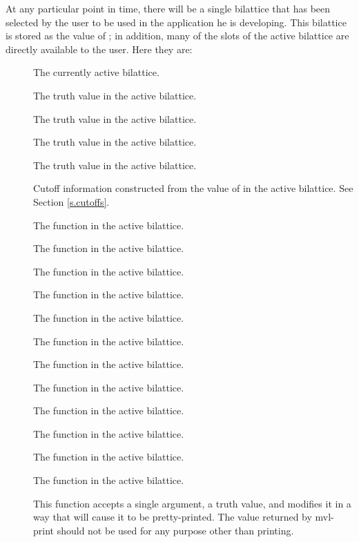 At any particular point in time, there will be a single bilattice
that has been selected by the user to be used in the application he
is developing.  This bilattice is stored as the value of
; in addition, many of the slots of the
active bilattice are directly available to the user.  Here they
are:

\begin{description}
 \item [] The currently active bilattice.
 \item [] The truth value  in the active bilattice.
 \item [] The truth value  in the active bilattice.
 \item [] The truth value  in the active
bilattice.
 \item [] The truth value  in the active bilattice.
 \item [] Cutoff information constructed from the
value of  in the active bilattice.  See Section
\ref{s.cutoffs}.
 \item [] The function  in the
active bilattice.
 \item [] The function  in the
active bilattice.
 \item [] The function  in the active bilattice.
 \item [] The function  in the active bilattice.
 \item [] The function  in the active bilattice.
 \item [] The function  in the active bilattice.
 \item [] The function  in the active bilattice.
 \item [] The function  in the active bilattice.
 \item [] The function  in the active
bilattice.
 \item [] The function  in the active 
bilattice.
 \item [] The function  in the active bilattice.
 \item [] The function  in the active bilattice.
 \item [] This function accepts a single argument, a truth
value, and modifies it in a way that will cause it to be pretty-printed.
The value returned by mvl-print should not be used for any purpose other
than printing.
 \end{description}

